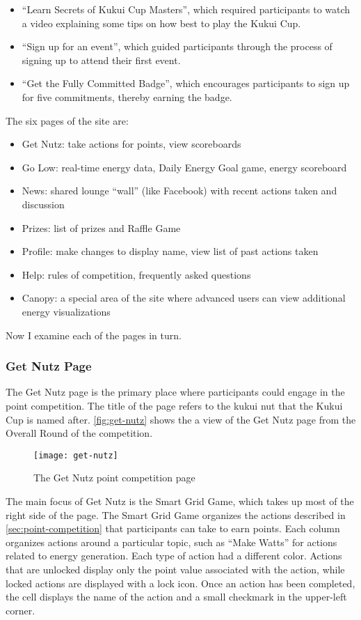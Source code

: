 \begin{itemize}
	\item ``Learn Secrets of Kukui Cup Masters'', which required participants to watch a video explaining some tips on how best to play the Kukui Cup.
	\item ``Sign up for an event'', which guided participants through the process of signing up to attend their first event.
	\item ``Get the Fully Committed Badge'', which encourages participants to sign up for five commitments, thereby earning the badge.
\end{itemize}

The six pages of the site are:
\begin{itemize}
	\item Get Nutz: take actions for points, view scoreboards
	\item Go Low: real-time energy data, Daily Energy Goal game, energy scoreboard
	\item News: shared lounge ``wall'' (like Facebook) with recent actions taken and discussion
	\item Prizes: list of prizes and Raffle Game
	\item Profile: make changes to display name, view list of past actions taken
	\item Help: rules of competition, frequently asked questions
	\item Canopy: a special area of the site where advanced users can view additional energy visualizations
\end{itemize}

Now I examine each of the pages in turn.


\subsubsection{Get Nutz Page}

The Get Nutz page is the primary place where participants could engage in the point competition. The title of the page refers to the kukui nut that the Kukui Cup is named after. \autoref{fig:get-nutz} shows the a view of the Get Nutz page from the Overall Round of the competition.

\begin{figure}[htbp]
	\centering
		\texttt{[image: get-nutz]}
		\caption{The Get Nutz point competition page}
\label{fig:get-nutz}
\end{figure}

The main focus of Get Nutz is the Smart Grid Game, which takes up most of the right side of the page. The Smart Grid Game organizes the actions described in \autoref{sec:point-competition} that participants can take to earn points. Each column organizes actions around a particular topic, such as ``Make Watts'' for actions related to energy generation. Each type of action had a different color. Actions that are unlocked display only the point value associated with the action, while locked actions are displayed with a lock icon. Once an action has been completed, the cell displays the name of the action and a small checkmark in the upper-left corner.


